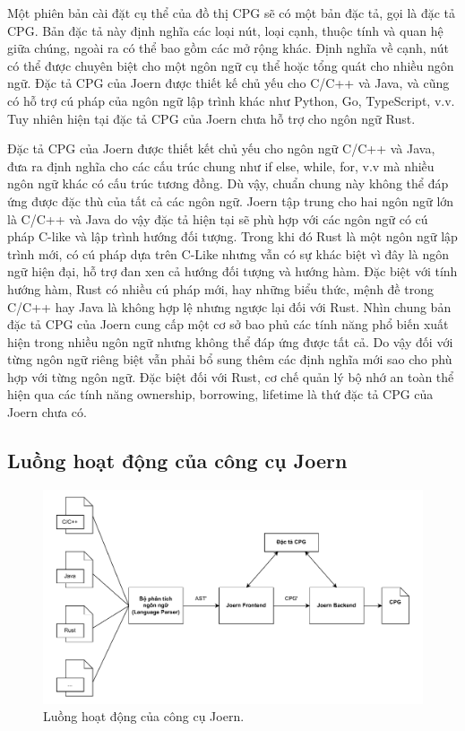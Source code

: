 Một phiên bản cài đặt cụ thể của đồ thị CPG sẽ có một bản đặc tả, gọi là đặc tả CPG.
Bản đặc tả này định nghĩa các loại nút, loại cạnh, thuộc tính và quan hệ giữa chúng, ngoài ra có thể bao gồm các mở rộng khác.
Định nghĩa về cạnh, nút có thể được chuyên biệt cho một ngôn ngữ cụ thể hoặc tổng quát cho nhiều ngôn ngữ.
Đặc tả CPG của Joern được thiết kế chủ yếu cho C/C++ và Java, và cũng có hỗ trợ cú pháp của ngôn ngữ lập trình khác như Python, Go, TypeScript, v.v.
Tuy nhiên hiện tại đặc tả CPG của Joern chưa hỗ trợ cho ngôn ngữ Rust.

Đặc tả CPG của Joern được thiết kết chủ yếu cho ngôn ngữ C/C++ và Java, đưa ra định nghĩa cho các cấu trúc chung như if else, while, for, v.v mà nhiều ngôn ngữ khác có cấu trúc tương đồng.
Dù vậy, chuẩn chung này không thể đáp ứng được đặc thù của tất cả các ngôn ngữ.
Joern tập trung cho hai ngôn ngữ lớn là C/C++ và Java do vậy đặc tả hiện tại sẽ phù hợp với các ngôn ngữ có cú pháp C-like và lập trình hướng đối tượng.
Trong khi đó Rust là một ngôn ngữ lập trình mới, có cú pháp dựa trên C-Like nhưng vẫn có sự khác biệt vì đây là ngôn ngữ hiện đại, hỗ trợ đan xen cả hướng đối tượng và hướng hàm.
Đặc biệt với tính hướng hàm, Rust có nhiều cú pháp mới, hay những biểu thức, mệnh đề trong C/C++ hay Java là không hợp lệ nhưng ngược lại đối với Rust.
Nhìn chung bản đặc tả CPG của Joern cung cấp một cơ sở bao phủ các tính năng phổ biến xuất hiện trong nhiều ngôn ngữ nhưng không thể đáp ứng được tất cả.
Do vậy đối với từng ngôn ngữ riêng biệt vẫn phải bổ sung thêm các định nghĩa mới sao cho phù hợp với từng ngôn ngữ.
Đặc biệt đối với Rust, cơ chế quản lý bộ nhớ an toàn thể hiện qua các tính năng ownership, borrowing, lifetime là thứ đặc tả CPG của Joern chưa có.

\subsection{Luồng hoạt động của công cụ Joern}
\label{sec:joern_flow}

\begin{figure}[H]
  \includegraphics[width=1\columnwidth]{figures/c2/c2_frontend_backend.drawio.pdf}
  \centering
  \caption{Luồng hoạt động của công cụ Joern.}
  \label{img:c2_frontend_backend}
\end{figure}

